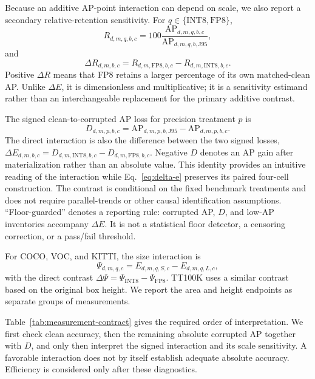 \documentclass[a4paper,fleqn]{cas-dc}
\newcommand{\AP}{\mathrm{AP}}
\newcommand{\Jclean}{\mathrm{J95}}
\begin{document}
Because an additive AP-point interaction can depend on scale, we also report a secondary relative-retention sensitivity. For $q\in\{\mathrm{INT8},\mathrm{FP8}\}$,
\begin{equation}
R_{d,m,q,b,c}=100\frac{\AP_{d,m,q,b,c}}{\AP_{d,m,q,b,\Jclean}},
\end{equation}
and
\begin{equation}
\Delta R_{d,m,b,c}=R_{d,m,\mathrm{FP8},b,c}-R_{d,m,\mathrm{INT8},b,c}.
\label{eq:delta-r}
\end{equation}
Positive $\Delta R$ means that FP8 retains a larger percentage of its own matched-clean AP. Unlike $\Delta E$, it is dimensionless and multiplicative; it is a sensitivity estimand rather than an interchangeable replacement for the primary additive contrast.

The signed clean-to-corrupted AP loss for precision treatment $p$ is
\begin{equation}
D_{d,m,p,b,c}=\AP_{d,m,p,b,\Jclean}-\AP_{d,m,p,b,c}.
\label{eq:d}
\end{equation}
The direct interaction is also the difference between the two signed losses, $\Delta E_{d,m,b,c}=D_{d,m,\mathrm{INT8},b,c}-D_{d,m,\mathrm{FP8},b,c}$. Negative $D$ denotes an AP gain after materialization rather than an absolute value. This identity provides an intuitive reading of the interaction while Eq.~\eqref{eq:delta-e} preserves its paired four-cell construction. The contrast is conditional on the fixed benchmark treatments and does not require parallel-trends or other causal identification assumptions. ``Floor-guarded'' denotes a reporting rule: corrupted AP, $D$, and low-AP inventories accompany $\Delta E$. It is not a statistical floor detector, a censoring correction, or a pass/fail threshold.

For COCO, VOC, and KITTI, the size interaction is
\begin{equation}
\Psi_{d,m,q,c}=E_{d,m,q,S,c}-E_{d,m,q,L,c},
\end{equation}
with the direct contrast $\Delta\Psi=\Psi_{\mathrm{INT8}}-\Psi_{\mathrm{FP8}}$. TT100K uses a similar contrast based on the original box height. We report the area and height endpoints as separate groups of measurements.

Table~\ref{tab:measurement-contract} gives the required order of interpretation. We first check clean accuracy, then the remaining absolute corrupted AP together with $D$, and only then interpret the signed interaction and its scale sensitivity. A favorable interaction does not by itself establish adequate absolute accuracy. Efficiency is considered only after these diagnostics.
\end{document}
